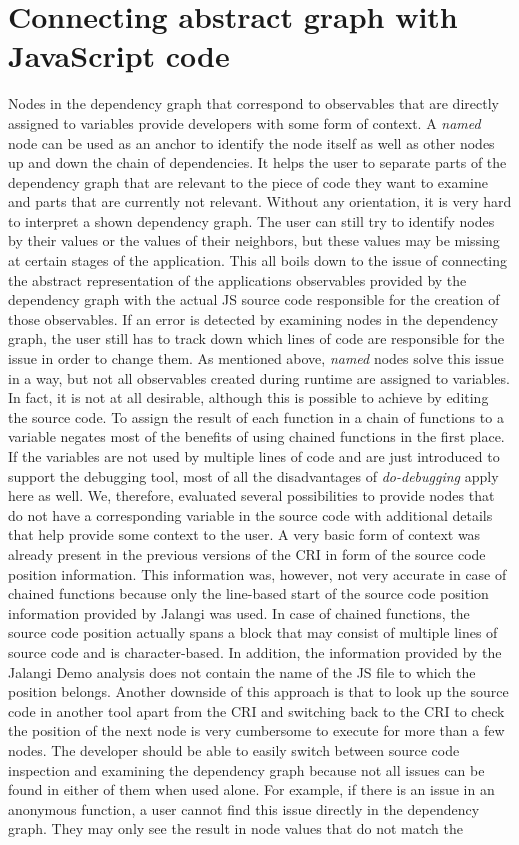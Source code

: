 \section{Connecting abstract graph with JavaScript code}
Nodes in the dependency graph that correspond to observables that are directly assigned to variables provide developers with some form of context. A \emph{named} node can be used as an anchor to identify the node itself as well as other nodes up and down the chain of dependencies. It helps the user to separate parts of the dependency graph that are relevant to the piece of code they want to examine and parts that are currently not relevant. Without any orientation, it is very hard to interpret a shown dependency graph. The user can still try to identify nodes by their values or the values of their neighbors, but these values may be missing at certain stages of the application. This all boils down to the issue of connecting the abstract representation of the applications observables provided by the dependency graph with the actual JS source code responsible for the creation of those observables. If an error is detected by examining nodes in the dependency graph, the user still has to track down which lines of code are responsible for the issue in order to change them. As mentioned above, \emph{named} nodes solve this issue in a way, but not all observables created during runtime are assigned to variables. In fact, it is not at all desirable, although this is possible to achieve by editing the source code. To assign the result of each function in a chain of functions to a variable negates most of the benefits of using chained functions in the first place. If the variables are not used by multiple lines of code and are just introduced to support the debugging tool, most of all the disadvantages of \emph{do-debugging} apply here as well. We, therefore, evaluated several possibilities to provide nodes that do not have a corresponding variable in the source code with additional details that help provide some context to the user. A very basic form of context was already present in the previous versions of the CRI in form of the source code position information. This information was, however, not very accurate in case of chained functions because only the line-based start of the source code position information provided by Jalangi was used. In case of chained functions, the source code position actually spans a block that may consist of multiple lines of source code and is character-based. In addition, the information provided by the Jalangi Demo analysis does not contain the name of the JS file to which the position belongs. Another downside of this approach is that to look up the source code in another tool apart from the CRI and switching back to the CRI to check the position of the next node is very cumbersome to execute for more than a few nodes. The developer should be able to easily switch between source code inspection and examining the dependency graph because not all issues can be found in either of them when used alone. For example, if there is an issue in an anonymous function, a user cannot find this issue directly in the dependency graph. They may only see the result in node values that do not match the 